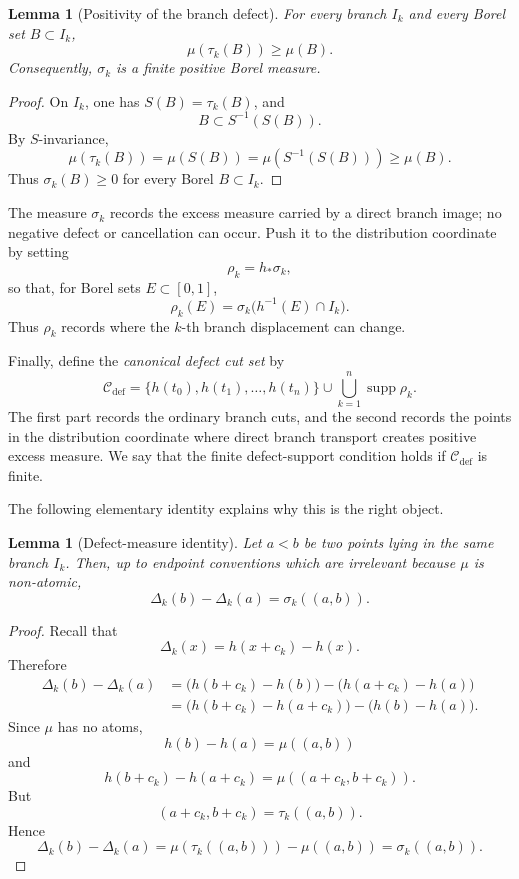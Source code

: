 \documentclass[11pt]{amsart}
\theoremstyle{plain}
\newtheorem{lemma}[theorem]{Lemma}
\theoremstyle{definition}
\theoremstyle{remark}
\DeclareMathOperator{\supp}{supp}
\newcommand{\cC}{\mathcal C}
\begin{document}
\begin{lemma}[Positivity of the branch defect]\label{lem:positive-branch-defect}
For every branch \(I_k\) and every Borel set \(B\subset I_k\),
\[
        \mu(\tau_k(B))\geq\mu(B).
\]
Consequently, \(\sigma_k\) is a finite positive Borel measure.
\end{lemma}

\begin{proof}
On \(I_k\), one has \(S(B)=\tau_k(B)\), and
\[
        B\subset S^{-1}(S(B)).
\]
By \(S\)-invariance,
\[
\mu(\tau_k(B))
=\mu(S(B))
=\mu(S^{-1}(S(B)))
\geq\mu(B).
\]
Thus \(\sigma_k(B)\geq0\) for every Borel \(B\subset I_k\).
\end{proof}

The measure \(\sigma_k\) records the excess measure carried by a direct branch image; no
negative defect or cancellation can occur. Push it to the distribution coordinate by setting
\[
        \rho_k=h_*\sigma_k,
\]
so that, for Borel sets \(E\subset[0,1]\),
\[
        \rho_k(E)=\sigma_k\bigl(h^{-1}(E)\cap I_k\bigr).
\]
Thus \(\rho_k\) records where the \(k\)-th branch displacement can change.

Finally, define the \emph{canonical defect cut set} by
\[
        \cC_{\mathrm{def}}
        =
        \{h(t_0),h(t_1),\ldots,h(t_n)\}
        \cup
        \bigcup_{k=1}^n \supp\rho_k.
\]
The first part records the ordinary branch cuts, and the second records the points in the
distribution coordinate where direct branch transport creates positive excess measure. We
say that the finite defect-support condition holds if \(\cC_{\mathrm{def}}\) is finite.

The following elementary identity explains why this is the right object.

\begin{lemma}[Defect-measure identity]\label{lem:defect-measure-identity}
Let \(a<b\) be two points lying in the same branch \(I_k\). Then, up to endpoint
conventions which are irrelevant because \(\mu\) is non-atomic,
\[
        \Delta_k(b)-\Delta_k(a)=\sigma_k((a,b)).
\]
\end{lemma}

\begin{proof}
Recall that
\[
        \Delta_k(x)=h(x+c_k)-h(x).
\]
Therefore
\[
\begin{aligned}
\Delta_k(b)-\Delta_k(a)
&=
\bigl(h(b+c_k)-h(b)\bigr)
-
\bigl(h(a+c_k)-h(a)\bigr) \\
&=
\bigl(h(b+c_k)-h(a+c_k)\bigr)
-
\bigl(h(b)-h(a)\bigr).
\end{aligned}
\]
Since \(\mu\) has no atoms,
\[
        h(b)-h(a)=\mu((a,b))
\]
and
\[
        h(b+c_k)-h(a+c_k)=\mu((a+c_k,b+c_k)).
\]
But
\[
        (a+c_k,b+c_k)=\tau_k((a,b)).
\]
Hence
\[
\Delta_k(b)-\Delta_k(a)
=
\mu(\tau_k((a,b)))-\mu((a,b))
=
\sigma_k((a,b)).
\]
\end{proof}
\end{document}
